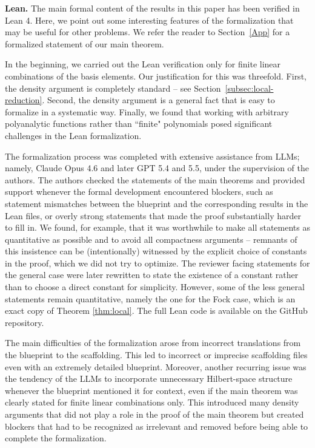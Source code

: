 \documentclass[11pt]{amsart}
\theoremstyle{remark}
\begin{document}
\textbf{Lean.} The main formal content of the results in this paper has been verified in Lean 4.  Here, we point out some interesting features of the formalization that may be useful for other problems. We refer the reader to Section~\ref{App} for a formalized statement of our main theorem.
\medskip

In the beginning, we carried out the Lean verification only for finite linear combinations of the basis elements. Our justification for this was threefold. First, the density argument is completely standard -- see Section~\ref{subsec:local-reduction}. Second, the density argument is a general fact that is easy to formalize in a systematic way. Finally, we found that working with arbitrary polyanalytic functions rather than ``finite" polynomials posed significant challenges in the Lean formalization.
\medskip


The formalization process was completed with extensive assistance from LLMs; namely, Claude Opus 4.6 and later GPT 5.4 and 5.5, under the supervision of the authors. The authors checked the statements of the main theorems and provided support whenever the formal development encountered blockers, such as statement mismatches between the blueprint and the corresponding results in the Lean files, or overly strong statements that made the proof substantially harder to fill in. We found, for example, that it was worthwhile to make all statements as quantitative as possible and to avoid all compactness arguments -- remnants of this insistence can be (intentionally) witnessed by the explicit choice of constants in the proof, which we did not try to optimize. The reviewer facing statements for the general case were later rewritten to state the existence of a constant rather than to choose a direct constant for simplicity. However, some of the less general statements remain quantitative, namely the one for the Fock case, which is an exact copy of Theorem \ref{thm:local}. The full Lean code is available on the GitHub repository. 
\medskip

The main difficulties of the formalization arose from incorrect translations from the blueprint to the scaffolding. This led to incorrect or imprecise scaffolding files even with an extremely detailed blueprint. Moreover, another recurring issue was the tendency of the LLMs to incorporate unnecessary Hilbert-space structure whenever the blueprint mentioned it for context, even if the main theorem was clearly stated for finite linear combinations only. This introduced many density arguments that did not play a role in the proof of the main theorem but created blockers that had to be recognized as irrelevant and removed before being able to complete the formalization. 
\end{document}
